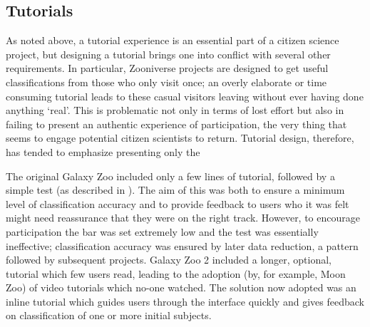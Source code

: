 \documentclass{sigchi}
\begin{document}





\subsection{Tutorials}

As noted above, a tutorial experience is an essential part of a citizen science project, but designing a tutorial brings one into conflict with several other requirements. In particular, Zooniverse projects are designed to get useful classifications from those who only visit once; an overly elaborate or time consuming tutorial leads to these casual visitors leaving without ever having done anything `real'. This is problematic not only in terms of lost effort but also in failing to present an authentic experience of participation, the very thing that seems to engage potential citizen scientists to return. Tutorial design, therefore, has tended to emphasize presenting only the 

The original Galaxy Zoo included only a few lines of tutorial, followed by a simple test (as described in \cite{Lintott}). The aim of this was both to ensure a minimum level of classification accuracy and to provide feedback to users who it was felt might need reassurance that they were on the right track. However, to encourage participation the bar was set extremely low and the test was essentially ineffective; classification accuracy was ensured by later data reduction, a pattern followed by subsequent projects. Galaxy Zoo 2 included a longer, optional, tutorial which few users read, leading to the adoption (by, for example, Moon Zoo) of video tutorials which no-one watched. The solution now adopted was an inline tutorial which guides users through the interface quickly and gives feedback on classification of one or more initial subjects.
\end{document}
